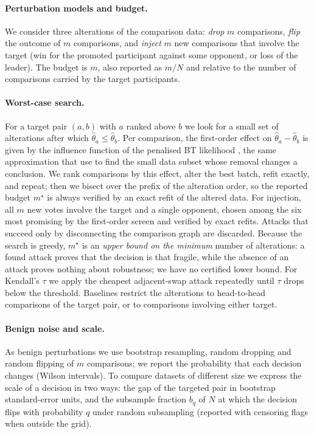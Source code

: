 \documentclass{article}
\begin{document}
\paragraph{Perturbation models and budget.}
We consider three alterations of the comparison data: \emph{drop} $m$ comparisons, \emph{flip} the outcome of $m$ comparisons, and \emph{inject} $m$ new comparisons that involve the target (win for the promoted participant against some opponent, or loss of the leader).
The budget is $m$, also reported as $m/N$ and relative to the number of comparisons carried by the target participants.
\paragraph{Worst-case search.}
For a target pair $(a,b)$ with $a$ ranked above $b$ we look for a small set of alterations after which $\hat\theta_a\le\hat\theta_b$.
Per comparison, the first-order effect on $\hat\theta_a-\hat\theta_b$ is given by the influence function of the penalised BT likelihood \citep{koh2017influence},
the same approximation that \citet{broderick2020amip} use to find the small data subset whose removal changes a conclusion.
We rank comparisons by this effect, alter the best batch, refit exactly, and repeat; then we bisect over the prefix of the alteration order, so the reported budget $m^\star$ is always verified by an exact refit of the altered data.
For injection, all $m$ new votes involve the target and a single opponent, chosen among the six most promising by the first-order screen and verified by exact refits. Attacks that succeed only by disconnecting the comparison graph are discarded.
Because the search is greedy, $m^\star$ is an \emph{upper bound on the minimum} number of alterations: a found attack proves that the decision is that fragile, while the absence of an attack proves nothing about robustness; we have no certified lower bound.
For Kendall's $\tau$ we apply the cheapest adjacent-swap attack repeatedly until $\tau$ drops below the threshold.
Baselines restrict the alterations to head-to-head comparisons of the target pair, or to comparisons involving either target.
\paragraph{Benign noise and scale.}
As benign perturbations we use bootstrap resampling, random dropping and random flipping of $m$ comparisons; we report the probability that each decision changes (Wilson intervals).
To compare datasets of different size we express the scale of a decision in two ways: the gap of the targeted pair in bootstrap standard-error units, and the subsample fraction $b_q$ of $N$ at which the decision flips with probability $q$ under random subsampling (reported with censoring flags when outside the grid).
\end{document}
